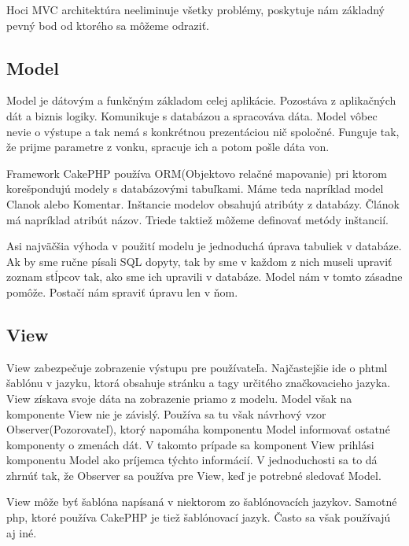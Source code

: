 \documentclass[12pt]{book}
\begin{document}
Hoci MVC architektúra neeliminuje všetky problémy, poskytuje nám základný pevný bod od ktorého sa môžeme odraziť.

\subsection{Model}
Model je dátovým a funkčným základom celej aplikácie. Pozostáva z aplikačných dát a biznis logiky. Komunikuje s databázou a spracováva dáta. Model vôbec nevie o výstupe a tak nemá s konkrétnou prezentáciou nič spoločné. Funguje tak, že prijme parametre z vonku, spracuje ich a potom pošle dáta von. 

Framework CakePHP používa ORM(Objektovo relačné mapovanie) pri ktorom korešpondujú modely s databázovými tabuľkami. Máme teda napríklad model Clanok alebo Komentar. Inštancie modelov obsahujú atribúty z databázy. Článok má napríklad atribút názov. Triede taktiež môžeme definovať metódy inštancií.

Asi najväčšia výhoda v použití modelu je jednoduchá úprava tabuliek v databáze.  Ak by sme ručne písali SQL dopyty, tak by sme v každom z nich museli upraviť zoznam stĺpcov tak, ako sme ich upravili v databáze. Model nám v tomto zásadne pomôže. Postačí nám spraviť úpravu len v ňom.

\subsection{View}
View zabezpečuje zobrazenie výstupu pre používateľa. Najčastejšie ide o phtml šablónu v jazyku, ktorá obsahuje stránku a tagy určitého značkovacieho jazyka. View získava svoje dáta na zobrazenie priamo z modelu. Model však na komponente View nie je závislý. Používa sa tu však návrhový vzor Observer(Pozorovateľ), ktorý napomáha komponentu Model  informovať ostatné komponenty o zmenách dát. V takomto prípade sa komponent View prihlási komponentu Model ako príjemca týchto informácií. V jednoduchosti sa to dá zhrnúť tak, že Observer sa používa pre View, keď je potrebné sledovať Model.
\newline
\par
View môže byť šablóna napísaná v niektorom zo šablónovacích jazykov. Samotné php, ktoré používa CakePHP je tiež šablónovací jazyk. Často sa však používajú aj iné. 
\newline
\end{document}
